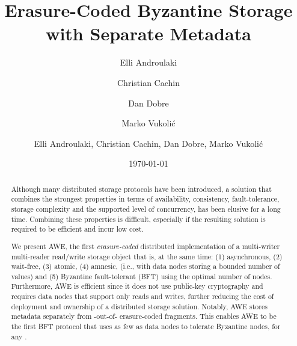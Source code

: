 \documentclass[oribibl]{llncs}
\theoremstyle{definition-boldhead}
\newcommand{\NAME}{AWE\xspace}
\newcommand{\nodes}{nodes\xspace}
\begin{document}
\title{\bf Erasure-Coded Byzantine Storage with Separate Metadata}


\if\submit\no

\author{Elli Androulaki\footnotemark[1]
  \and Christian Cachin\footnotemark[1]
  \and Dan Dobre\footnotemark[2]
  \and Marko Vukoli\'c\footnotemark[3]
  }

\date{\today}

\renewcommand{\thefootnote}{\fnsymbol{footnote}}
\renewcommand{\thefootnote}{\arabic{footnote}}


\else


\author{Elli Androulaki,
  Christian Cachin,
  Dan Dobre,
  Marko Vukoli\'c}


\fi


\maketitle

\pagestyle{plain}
\thispagestyle{plain}

\begin{abstract}\noindent
  Although many distributed storage protocols have been introduced, a
  solution that combines the strongest properties in terms of
  availability, consistency, fault-tolerance, storage complexity and
  the supported level of concurrency, has been elusive for a long
  time. Combining these properties is difficult, especially if the
  resulting solution is required to be efficient and incur low cost.

  We present \NAME, the first \emph{erasure-coded} distributed
  implementation of a multi-writer multi-reader read/write storage
  object that is, at the same time: (1) asynchronous, (2) wait-free,
  (3) atomic, (4) amnesic, (i.e., with data \nodes storing a bounded
  number of values) and (5) Byzantine fault-tolerant (BFT) using the
  optimal number of \nodes. Furthermore, \NAME is efficient since it
  does not use public-key cryptography and requires data \nodes that
  support only reads and writes, further reducing the cost of
  deployment and ownership of a distributed storage solution. Notably,
  \NAME stores metadata separately from -out-of- erasure-coded
  fragments. This enables \NAME to be the first BFT protocol that uses
  as few as  data \nodes to tolerate  Byzantine \nodes, for
  any .
\end{abstract}
\end{document}
